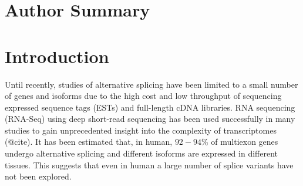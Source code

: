 \documentclass[10pt]{article}
\begin{document}



\section*{Author Summary}

\section*{Introduction}

Until recently, studies of alternative splicing have been limited to a
small number of genes and isoforms due to the high cost and low throughput
of sequencing expressed sequence tags (ESTs) and full-length cDNA
libraries.  RNA sequencing (RNA-Seq) using deep short-read sequencing
has been used successfully in many studies to gain unprecedented
insight into the complexity of transcriptomes (@cite).
It has been estimated that, in human, $92-94$\% of multiexon genes
undergo alternative splicing and different isoforms are expressed in
different tissues\cite{Wang:2008ea}.  This suggests that even in human
a large number of splice variants have not been explored.

\end{document}
